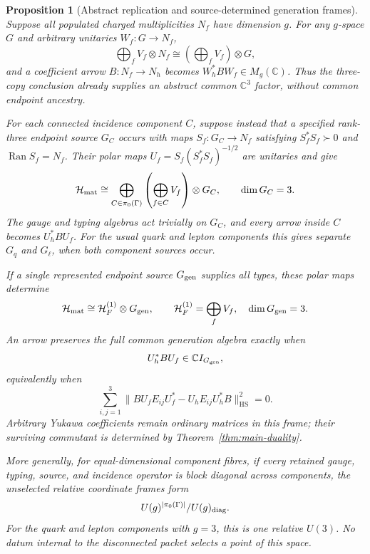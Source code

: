 \documentclass[11pt]{article}
\numberwithin{equation}{section}
\newtheorem{proposition}[theorem]{Proposition}
\theoremstyle{definition}
\theoremstyle{remark}
\newcommand{\C}{\mathbb C}
\newcommand{\Ran}{\operatorname{Ran}}
\newcommand{\HS}{\mathrm{HS}}
\begin{document}
\begin{proposition}[Abstract replication and source-determined generation frames]
\label{thm:common-generation-factor}
Suppose all populated charged multiplicities $N_f$ have dimension $g$.
For any $g$-space $G$ and arbitrary unitaries $W_f:G\to N_f$,
\begin{equation}
 \bigoplus_fV_f\otimes N_f\cong\left(\bigoplus_fV_f\right)\otimes G,
 \label{eq:abstract-global-generation-factor}
\end{equation}
and a coefficient arrow $B:N_f\to N_h$ becomes $W_h^*BW_f\in M_g(\C)$.
Thus the three-copy conclusion already supplies an abstract common
$\C^3$ factor, without common endpoint ancestry.

For each connected incidence component $C$, suppose instead that a
specified rank-three endpoint source $G_C$ occurs with maps
$S_f:G_C\to N_f$ satisfying $S_f^*S_f\succ0$ and $\Ran S_f=N_f$.
Their polar maps $U_f=S_f(S_f^*S_f)^{-1/2}$ are unitaries and give
\begin{equation}
 \mathcal H_{\rm mat}\cong\bigoplus_{C\in\pi_0(\Gamma)}
       \left(\bigoplus_{f\in C}V_f\right)\otimes G_C,
 \qquad\dim G_C=3.
 \label{eq:componentwise-generation-factorization}
\end{equation}
The gauge and typing algebras act trivially on $G_C$, and every arrow
inside $C$ becomes $U_h^*BU_f$.  For the usual quark and lepton components
this gives separate $G_q$ and $G_\ell$, when both component sources occur.

If a single represented endpoint source $G_{\rm gen}$ supplies all types,
these polar maps determine
\begin{equation}
 \mathcal H_{\rm mat}\cong\mathcal H_F^{(1)}\otimes G_{\rm gen},\qquad
 \mathcal H_F^{(1)}=\bigoplus_fV_f,\quad\dim G_{\rm gen}=3.
 \label{eq:common-generation-factorization}
\end{equation}
An arrow preserves the full common generation algebra exactly when
\begin{equation}
 U_h^*BU_f\in\C I_{G_{\rm gen}},\label{eq:generation-neutral-incidence}
\end{equation}
equivalently when
\begin{equation}
 \sum_{i,j=1}^3\|BU_fE_{ij}U_f^*-U_hE_{ij}U_h^*B\|_{\HS}^2=0.
 \label{eq:generation-compatibility-defect}
\end{equation}
Arbitrary Yukawa coefficients remain ordinary matrices in this frame;
their surviving commutant is determined by Theorem~\ref{thm:main-duality}.

More generally, for equal-dimensional component fibres, if every retained
gauge, typing, source, and incidence operator is block diagonal across
components, the unselected relative coordinate frames form
\begin{equation}
 U(g)^{|\pi_0(\Gamma)|}/U(g)_{\rm diag}.
 \label{eq:relative-generation-frame-space}
\end{equation}
For the quark and lepton components with $g=3$, this is one relative $U(3)$.
No datum internal to the disconnected packet selects a point of this space.
\end{proposition}
\end{document}
